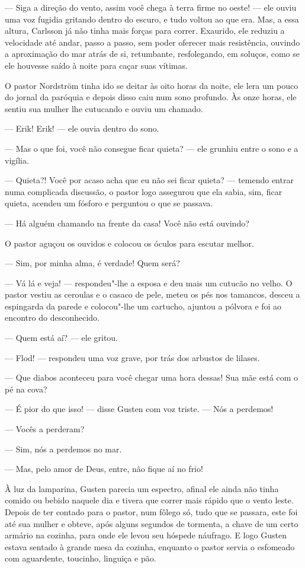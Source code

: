 --- Siga a direção do vento, assim você chega à terra firme no oeste! --- ele
ouviu uma voz fugidia gritando dentro do escuro, e tudo voltou ao que era.
Mas, a essa altura, Carlsson já não tinha mais forças para correr. Exaurido, ele
reduziu a velocidade até andar, passo a passo, sem poder oferecer mais
resistência, ouvindo a aproximação do mar atrás de si, retumbante, resfolegando,
em soluços, como se ele houvesse saído à noite para caçar suas vítimas.

\asterisc

 O pastor Nordström tinha ido se deitar às oito horas da noite, ele lera um pouco
 do jornal da paróquia e depois disso caiu num sono profundo. Às onze horas, ele
 sentiu sua mulher lhe cutucando e ouviu um chamado.

--- Erik! Erik! --- ele ouvia dentro do sono.

--- Mas o que foi, você não consegue ficar quieta? --- ele grunhiu entre o sono e a vigília.

--- Quieta?! Você por acaso acha que eu não sei ficar quieta? --- temendo entrar
numa complicada discussão, o pastor logo assegurou que ela sabia, sim, ficar
quieta, acendeu um fósforo e perguntou o que se passava.

--- Há alguém chamando na frente da casa! Você não está ouvindo?

O pastor aguçou os ouvidos e colocou os óculos para escutar melhor.

--- Sim, por minha alma, é verdade! Quem será?

--- Vá lá e veja! --- respondeu"-lhe a esposa e deu mais um cutucão no velho. O
pastor vestiu as ceroulas e o casaco de pele, meteu os pés nos tamancos, desceu
a espingarda da parede e colocou"-lhe um cartucho, ajuntou a pólvora e foi ao
encontro do desconhecido.

--- Quem está aí? --- ele gritou.

--- Flod! --- respondeu uma voz grave, por trás dos arbustos de lilases.

--- Que diabos aconteceu para você chegar uma hora dessas! Sua mãe está com o pé
na cova?

--- É pior do que isso! --- disse Gusten com voz triste. --- Nós a perdemos!

--- Vocês a perderam?

--- Sim, nós a perdemos no mar.

--- Mas, pelo amor de Deus, entre, não fique aí no frio!

À luz da lamparina, Gusten parecia um espectro, afinal ele ainda não tinha
comido ou bebido naquele dia e tivera que correr mais rápido que o vento leste.
Depois de ter contado para o pastor, num fôlego só, tudo que se passara, este
foi até sua mulher e obteve, após alguns segundos de tormenta, a chave de um
certo armário na cozinha, para onde ele levou seu hóspede náufrago. E logo
Gusten estava sentado à grande mesa da cozinha, enquanto o pastor servia o
esfomeado com aguardente, toucinho, linguiça e pão.


